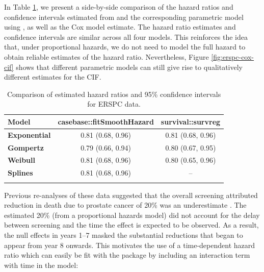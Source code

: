 \documentclass[
]{jss}
\begin{document}
In Table \ref{tab:print-erspc-estimates}, we present a side-by-side
comparison of the hazard ratios and confidence intervals estimated from
 and the corresponding parametric model using
, as well as the Cox model estimate. The hazard
ratio estimates and confidence intervals are similar across all four
models. This reinforces the idea that, under proportional hazards, we do
not need to model the full hazard to obtain reliable estimates of the
hazard ratio. Nevertheless, Figure \ref{fig:erspc-cox-cif} shows that
different parametric models can still give rise to qualitatively
different estimates for the CIF.

\begin{CodeChunk}
\begin{table}

\caption{\label{tab:print-erspc-estimates}Comparison of estimated hazard ratios and 95\% confidence intervals for ERSPC data.}
\centering
\begin{tabular}[t]{>{\bfseries}lcc}
\toprule
Model & casebase::fitSmoothHazard & survival::survreg\\
\midrule
Exponential & 0.81 (0.68, 0.96) & 0.81 (0.68, 0.96)\\
\cmidrule{1-3}
Gompertz & 0.79 (0.66, 0.94) & 0.80 (0.67, 0.95)\\
\cmidrule{1-3}
Weibull & 0.81 (0.68, 0.96) & 0.80 (0.65, 0.96)\\
\cmidrule{1-3}
Splines & 0.81 (0.68, 0.96) & --\\
\bottomrule
\multicolumn{3}{l}{Cox model estimate: HR (95\% CI) = 0.80 (0.67, 0.95)}\\
\end{tabular}
\end{table}

\end{CodeChunk}

Previous re-analyses of these data suggested that the overall screening
attributed reduction in death due to prostate cancer of 20\% was an
underestimate \citep{hanley2010mortality}. The estimated 20\% (from a
proportional hazards model) did not account for the delay between
screening and the time the effect is expected to be observed. As a
result, the null effects in years 1--7 masked the substantial reductions
that began to appear from year 8 onwards. This motivates the use of a
time-dependent hazard ratio which can easily be fit with the
 package by including an interaction term with time in the
model:
\end{document}
